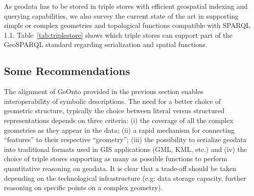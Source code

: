 \documentclass[a4paper,11pt]{report}
\begin{document}
As geodata has to be stored in triple stores with efficient geospatial indexing and querying capabilities, we also survey the current state of the art  in supporting simple or complex geometries and topological functions compatible with SPARQL 1.1. Table~\ref{tab:triplestore} shows which triple stores can support part of the GeoSPARQL standard regarding serialization and spatial functions.


\subsection{Some Recommendations}
The alignment of GeOnto provided in the previous section enables interoperability of symbolic descriptions. The need for a better choice of geometric structure, typically the choice between literal versus structured representations depends on three criteria: (i) the coverage of all the complex geometries as they appear in the data; (ii) a rapid mechanism for connecting ``features'' to their respective ``geometry''; (iii) the possibility to serialize geodata into traditional formats used in GIS applications (GML, KML, etc.) and (iv) the choice of triple stores supporting as many as possible functions to perform quantitative reasoning on geodata. It is clear that a trade-off should be taken depending on the technological infrastructure (e.g: data storage capacity, further reasoning on specific points on a complex geometry).
\end{document}
